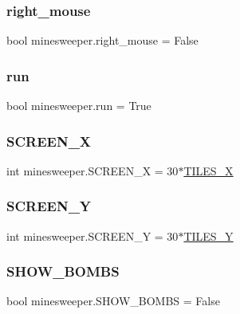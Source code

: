 \subsubsection{\texorpdfstring{right\_mouse}{right\_mouse}}
{\footnotesize\ttfamily bool minesweeper.\+right\+\_\+mouse = False}

\mbox{\label{namespaceminesweeper_a1c6096cb2d5d85959a0c2269fb507cd1}} 
\subsubsection{\texorpdfstring{run}{run}}
{\footnotesize\ttfamily bool minesweeper.\+run = True}

\mbox{\label{namespaceminesweeper_a1844cce3a8aa0b80dce337b5f39dedfb}} 
\subsubsection{\texorpdfstring{SCREEN\_X}{SCREEN\_X}}
{\footnotesize\ttfamily int minesweeper.\+S\+C\+R\+E\+E\+N\+\_\+X = 30$\ast$\mbox{\hyperlink{namespaceminesweeper_ac9707e38bc10ae8def8674e284754df2}{T\+I\+L\+E\+S\+\_\+X}}}

\mbox{\label{namespaceminesweeper_ab648a812026dc7c97d7267459db82451}} 
\subsubsection{\texorpdfstring{SCREEN\_Y}{SCREEN\_Y}}
{\footnotesize\ttfamily int minesweeper.\+S\+C\+R\+E\+E\+N\+\_\+Y = 30$\ast$\mbox{\hyperlink{namespaceminesweeper_a57ad9d0736fe592d6a6fa58ef8e6ab72}{T\+I\+L\+E\+S\+\_\+Y}}}

\mbox{\label{namespaceminesweeper_a019b9bd716098a1e8bad7266522f1ec8}} 
\subsubsection{\texorpdfstring{SHOW\_BOMBS}{SHOW\_BOMBS}}
{\footnotesize\ttfamily bool minesweeper.\+S\+H\+O\+W\+\_\+\+B\+O\+M\+BS = False}

